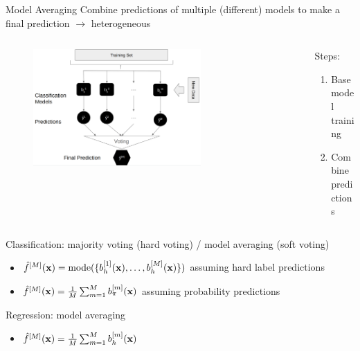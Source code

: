 \documentclass[10pt,compress,t,notes=noshow, xcolor=table]{beamer}
\begin{document}
\begin{vbframe}{Model Averaging}
\vfill
Combine predictions of multiple (different) models to make a final prediction $\rightarrow$ heterogeneous
\vfill
\begin{columns}
    \begin{column}{0.6\textwidth}
        \vspace{-1em}
        \begin{figure}
            \centering
            \includegraphics[width=0.7\textwidth]{figure/voting_better.png}
            \label{fig:voting}
        \end{figure}
    \end{column}
    \begin{column}{0.4\textwidth}
        Steps:
        \begin{enumerate}
            \item Base model training
            \item Combine predictions
        \end{enumerate}
    \end{column}
\end{columns}
\vfill
Classification: majority voting (hard voting) / model averaging (soft voting)
\begin{itemize}
    \item $\hat{f}^{[M]}(\mathbf{x}) = \text{mode}(\{b_{h}^{[1]}(\mathbf{x}), \ldots, b_{h}^{[M]}(\mathbf{x})\})$ assuming hard label predictions
    \item $\hat{f}^{[M]}(\mathbf{x}) = \frac{1}{M} \sum_{m = 1}^{M} b_{\pi}^{[m]}(\mathbf{x})$ assuming probability predictions
\end{itemize}
\vfill
Regression: model averaging
\begin{itemize}
    \item $\hat{f}^{[M]}(\mathbf{x}) = \frac{1}{M} \sum_{m = 1}^{M} b_{h}^{[m]}(\mathbf{x})$
\end{itemize}
\vfill
\end{vbframe}
\end{document}
